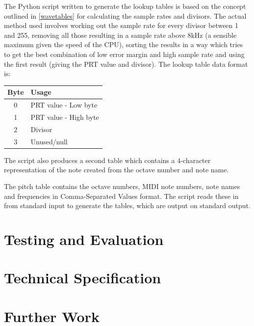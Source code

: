 \documentclass[a4paper,10pt]{article}
\begin{document}
The Python script written to generate the lookup tables is based on the concept outlined in 
\ref{wavetables} for calculating the sample rates and divisors.  The actual method used involves 
working out the sample rate for every divisor between 1 and 255, removing all those resulting in a 
sample rate above 8kHz (a sensible maximum given the speed of the CPU), sorting the results in a way 
which tries to get the best combination of low error margin and high sample rate and using the first 
result (giving the PRT value and divisor).  The lookup table data format is:

\begin{center}
\begin{tabular}{c l}
Byte & Usage\\
\hline
0 & PRT value - Low byte\\
1 & PRT value - High byte\\
2 & Divisor\\
3 & Unused/null\\
\end{tabular}
\end{center}

The script also produces a second table which contains a 4-character representation of the note 
created from the octave number and note name.

The pitch table contains the octave numbers, MIDI note numbers, note names and frequencies in 
Comma-Separated Values format.  The script reads these in from standard input to generate the 
tables, which are output on standard output.

\pagebreak
\section{Testing and Evaluation}

\pagebreak
\section{Technical Specification}

\pagebreak
\section{Further Work}


\appendix

\pagebreak
\begin{thebibliography}{99}
\end{thebibliography}
\end{document}

